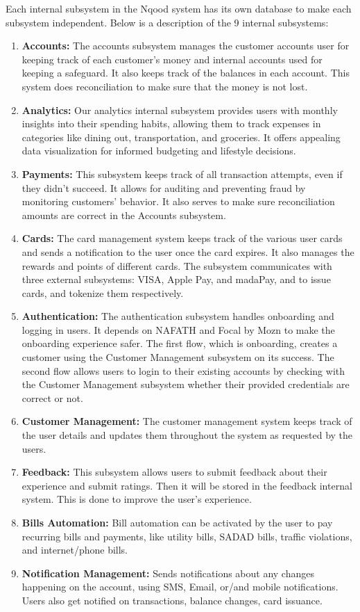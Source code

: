 \documentclass[a4paper]{report}
\begin{document}
Each internal subsystem in the Nqood system has its own database to make each subsystem independent. Below is a description of the 9 internal subsystems:

\begin{enumerate}
    \item \textbf{Accounts:} The accounts subsystem manages the customer accounts user for keeping track of each customer’s money and internal accounts used for keeping a safeguard. It also keeps track of the balances in each account. This system does reconciliation to make sure that the money is not lost.
    \item \textbf{Analytics:} Our analytics internal subsystem provides users with monthly insights into their spending habits, allowing them to track expenses in categories like dining out, transportation, and groceries. It offers appealing data visualization for informed budgeting and lifestyle decisions.
    \item \textbf{Payments:} This subsystem keeps track of all transaction attempts, even if they didn’t succeed. It allows for auditing and preventing fraud by monitoring customers’ behavior. It also serves to make sure reconciliation amounts are correct in the Accounts subsystem.
    \item \textbf{Cards:} The card management system keeps track of the various user cards and sends a notification to the user once the card expires. It also manages the rewards and points of different cards. The subsystem communicates with three external subsystems: VISA, Apple Pay, and madaPay, and to issue cards, and tokenize them respectively.
    \item \textbf{Authentication:} The authentication subsystem handles onboarding and logging in users. It depends on NAFATH and Focal by Mozn to make the onboarding experience safer. The first flow, which is onboarding, creates a customer using the Customer Management subsystem on its success. The second flow allows users to login to their existing accounts by checking with the Customer Management subsystem whether their provided credentials are correct or not.
    \item \textbf{Customer Management:} The customer management system keeps track of the user details and updates them throughout the system as requested by the users.
    \item \textbf{Feedback:} This subsystem allows users to submit feedback about their experience and submit ratings. Then it will be stored in the feedback internal system. This is done to improve the user's experience.
    \item \textbf{Bills Automation:} Bill automation can be activated by the user to pay recurring bills and payments, like utility bills, SADAD bills, traffic violations, and internet/phone bills.
    \item \textbf{Notification Management:} Sends notifications about any changes happening on the account, using SMS, Email, or/and mobile notifications. Users also get notified on transactions, balance changes, card issuance.
\end{enumerate}
\end{document}
